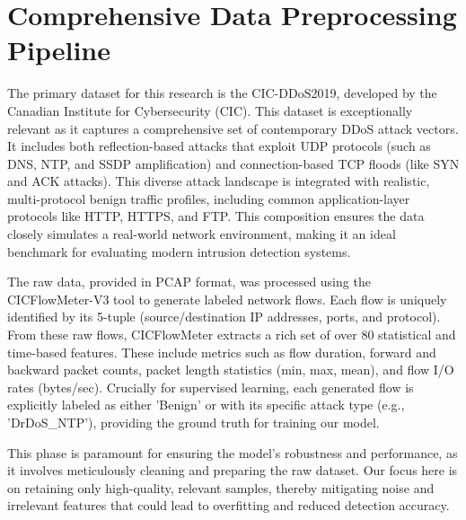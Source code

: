 \documentclass{report}
\begin{document}
\section{Comprehensive Data Preprocessing Pipeline}

The primary dataset for this research is the CIC-DDoS2019, developed by the Canadian Institute for Cybersecurity (CIC). This dataset is exceptionally relevant as it captures a comprehensive set of contemporary DDoS attack vectors. It includes both reflection-based attacks that exploit UDP protocols (such as DNS, NTP, and SSDP amplification) and connection-based TCP floods (like SYN and ACK attacks). This diverse attack landscape is integrated with realistic, multi-protocol benign traffic profiles, including common application-layer protocols like HTTP, HTTPS, and FTP. This composition ensures the data closely simulates a real-world network environment, making it an ideal benchmark for evaluating modern intrusion detection systems.

The raw data, provided in PCAP format, was processed using the CICFlowMeter-V3 tool to generate labeled network flows. Each flow is uniquely identified by its 5-tuple (source/destination IP addresses, ports, and protocol). From these raw flows, CICFlowMeter extracts a rich set of over 80 statistical and time-based features. These include metrics such as flow duration, forward and backward packet counts, packet length statistics (min, max, mean), and flow I/O rates (bytes/sec). Crucially for supervised learning, each generated flow is explicitly labeled as either 'Benign' or with its specific attack type (e.g., 'DrDoS\_NTP'), providing the ground truth for training our model.

This phase is paramount for ensuring the model's robustness and performance, as it involves meticulously cleaning and preparing the raw dataset. Our focus here is on retaining only high-quality, relevant samples, thereby mitigating noise and irrelevant features that could lead to overfitting and reduced detection accuracy. 
\end{document}
